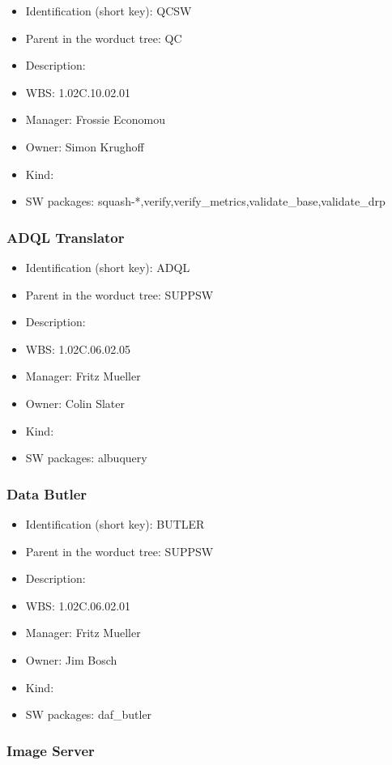 \begin{itemize}\item Identification (short key): QCSW
\item Parent in the worduct tree: QC
\item Description: 
\item WBS: 1.02C.10.02.01
\item Manager: Frossie Economou
\item Owner: Simon Krughoff
\item Kind:
\item SW packages: squash-*,verify,verify\_metrics,validate\_base,validate\_drp
\end{itemize}\subsubsection{ADQL Translator}
\begin{itemize}\item Identification (short key): ADQL
\item Parent in the worduct tree: SUPPSW
\item Description: 
\item WBS: 1.02C.06.02.05
\item Manager: Fritz Mueller
\item Owner: Colin Slater
\item Kind:
\item SW packages: albuquery
\end{itemize}\subsubsection{Data Butler}
\begin{itemize}\item Identification (short key): BUTLER
\item Parent in the worduct tree: SUPPSW
\item Description: 
\item WBS: 1.02C.06.02.01
\item Manager: Fritz Mueller
\item Owner: Jim Bosch
\item Kind:
\item SW packages: daf\_butler
\end{itemize}\subsubsection{Image Server}
